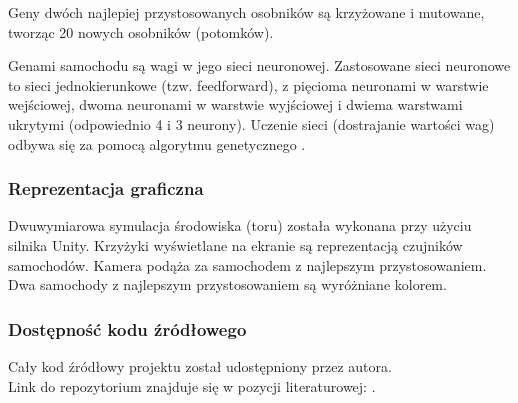 Geny dwóch najlepiej przystosowanych osobników są krzyżowane i mutowane, tworząc 20 nowych osobników (potomków).

Genami samochodu są wagi w jego sieci neuronowej.
Zastosowane sieci neuronowe to sieci jednokierunkowe (tzw. feedforward),
z pięcioma neuronami w warstwie wejściowej, dwoma neuronami w warstwie wyjściowej i dwiema warstwami ukrytymi (odpowiednio 4 i 3 neurony).
Uczenie sieci (dostrajanie wartości wag) odbywa się za pomocą algorytmu genetycznego \cite{geneticAlgorithm:introduction}.

\subsubsection{Reprezentacja graficzna}
Dwuwymiarowa symulacja środowiska (toru) została wykonana przy użyciu silnika Unity.
Krzyżyki wyświetlane na ekranie są reprezentacją czujników samochodów.
Kamera podąża za samochodem z najlepszym przystosowaniem.
Dwa samochody z najlepszym przystosowaniem są wyróżniane kolorem.

\subsubsection{Dostępność kodu źródłowego}
Cały kod źródłowy projektu został udostępniony przez autora. \\
Link do repozytorium znajduje się w pozycji literaturowej: \cite{artz:deepLearningCars:github}.
